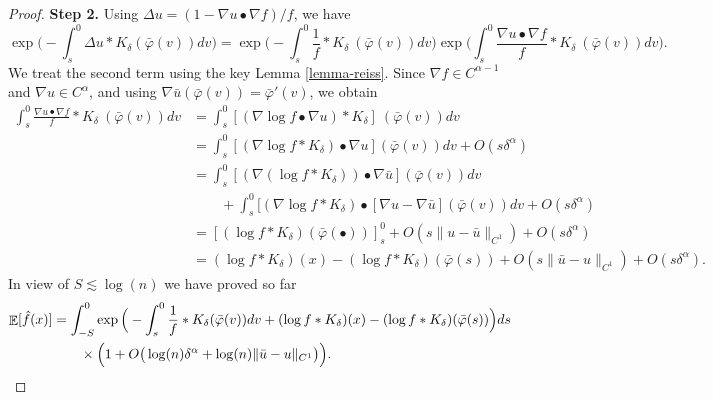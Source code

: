 \documentclass{article}
\numberwithin{equation}{section}
\theoremstyle{definition}
\DeclareMathOperator{\E}{{\mathbb E}}
\renewcommand{\phi}{\varphi}
\renewcommand{\cdot}{{\scriptstyle \bullet} }
\providecommand{\norm}[1]{\lVert #1 \rVert}
\begin{document}
\begin{proof}
\noindent \textbf{Step 2.} Using $\Delta u=(1-\nabla u\cdot \nabla f) / f$, we have
\[
        \exp\Big( -\int_s^0 \Delta u \ast K_\delta (\bar{\varphi} (v)) dv \Big) 
        =  \exp\Big(-\int_s^0 \frac 1f \ast K_\delta ~(\bar{\varphi} (v)) dv\Big) \exp \Big(\int_s^0 \frac{\nabla u\cdot \nabla f}{f}\ast K_\delta ~(\bar{\varphi} (v)) dv  \Big). 
\]
We treat the second term  using the key Lemma \ref{lemma-reiss}. Since $\nabla f\in C^{\alpha-1}$ and $\nabla u\in C^\alpha$, and using $\nabla \bar u(\bar\varphi(v)) = \bar\varphi'(v)$, we obtain
\begin{align*}
    \int_s^0 \frac{\nabla u\cdot \nabla f}{f}\ast K_\delta ~(\bar{\varphi} (v)) dv & = \int_s^0 [(\nabla \log f \cdot \nabla u)\ast K_\delta] ~(\bar{\varphi} (v)) dv \\
    &= \int_s^0 [ (\nabla \log f \ast K_\delta ) \cdot \nabla u](\bar{\varphi} (v)) dv +O(s\delta^\alpha)\\
    &= \int_s^0 [ (\nabla (\log f \ast K_\delta) ) \cdot \nabla \bar u](\bar{\varphi} (v)) dv \\
    &\qquad+ \int_s^0 [ (\nabla \log f \ast K_\delta ) \cdot [\nabla u-\nabla \bar u](\bar{\varphi} (v)) dv  +O(s\delta^\alpha)\\
    &= [(\log f\ast K_\delta ) (\bar \varphi(\cdot))]_{s}^0 + O(s\|u-\bar u\|_{C^1}) +O(s\delta^\alpha)\\
    &= (\log f \ast K_\delta) (x) - (\log f \ast K_\delta )(\bar \varphi(s))
   + O(s\|\bar u-u\|_{C^1}) + O(s\delta^\alpha).
\end{align*}
In view of $S\lesssim\log(n)$ we have proved so far
\begin{align} 
\E[\hat f(x)]&=\int_{-S}^0 \exp\Big(-\int_s^0 \frac 1f \ast K_\delta (\bar \varphi(v))dv + (\log f\ast K_\delta)(x)-(\log f\ast K_\delta)(\bar\phi(s)) \Big)  ds\notag\\ &\qquad \times\Big(1+O\big(\log(n)\delta^\alpha+\log(n)\norm{\bar u-u}_{C^1}\big)\Big).\label{EqStep2}
\end{align}


\end{proof}
\end{document}
